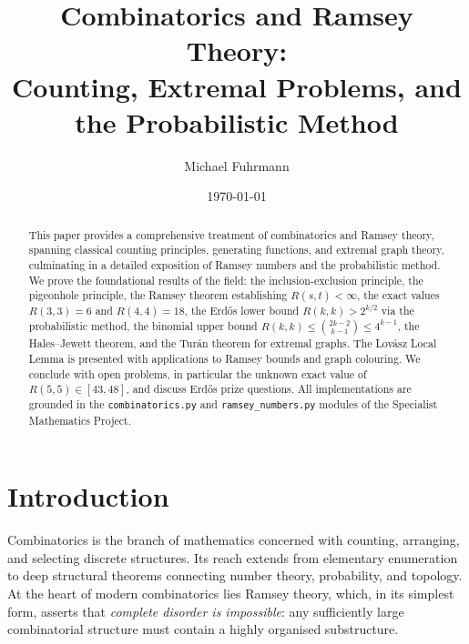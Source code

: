 \documentclass[12pt,a4paper]{amsart}
\theoremstyle{definition}
\theoremstyle{remark}
\begin{document}
\title{Combinatorics and Ramsey Theory:\\
Counting, Extremal Problems, and the Probabilistic Method}

\author{Michael Fuhrmann}
\address{Specialist Mathematics Project, Build 144}
\date{\today}

\begin{abstract}
This paper provides a comprehensive treatment of combinatorics and Ramsey theory,
spanning classical counting principles, generating functions, and extremal graph theory,
culminating in a detailed exposition of Ramsey numbers and the probabilistic method.
We prove the foundational results of the field: the inclusion-exclusion principle,
the pigeonhole principle, the Ramsey theorem establishing $R(s,t) < \infty$, the
exact values $R(3,3) = 6$ and $R(4,4) = 18$, the Erd\H{o}s lower bound
$R(k,k) > 2^{k/2}$ via the probabilistic method, the binomial upper bound
$R(k,k) \leq \binom{2k-2}{k-1} \leq 4^{k-1}$, the Hales--Jewett theorem, and the
Tur\'an theorem for extremal graphs.  The Lov\'asz Local Lemma is presented with
applications to Ramsey bounds and graph colouring.  We conclude with open problems,
in particular the unknown exact value of $R(5,5) \in [43, 48]$, and discuss
Erd\H{o}s prize questions.  All implementations are grounded in the
\texttt{combinatorics.py} and \texttt{ramsey\_numbers.py} modules of the
Specialist Mathematics Project.
\end{abstract}

\maketitle

\tableofcontents

\section{Introduction}

Combinatorics is the branch of mathematics concerned with counting, arranging,
and selecting discrete structures.  Its reach extends from elementary enumeration
to deep structural theorems connecting number theory, probability, and topology.
At the heart of modern combinatorics lies Ramsey theory, which, in its simplest
form, asserts that \emph{complete disorder is impossible}: any sufficiently large
combinatorial structure must contain a highly organised substructure.
\end{document}
